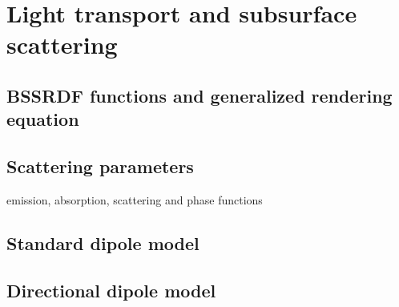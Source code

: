 \section{Light transport and subsurface scattering}
\subsection{BSSRDF functions and generalized rendering equation}
\subsection{Scattering parameters}
 emission, absorption, scattering and phase functions
\subsection{Standard dipole model}
\subsection{Directional dipole model}
